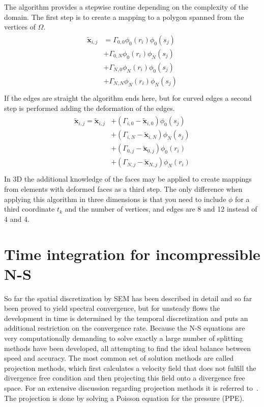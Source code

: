 The algorithm provides a stepwise routine depending on the complexity of the domain. The first step is to create 
a mapping to a polygon spanned from the vertices of $\Omega$.
%
\begin{align}
    \begin{split}
    \mathbf{\tilde{x}}_{i,j} 
             &=\Gamma_{0,0}\phi_0(r_i)\phi_0(s_j)\\
             &+\Gamma_{0,N}\phi_0(r_i)\phi_N(s_j)\\
             &+\Gamma_{N,0}\phi_N(r_i)\phi_0(s_j)\\
             &+\Gamma_{N,N}\phi_N(r_i)\phi_N(s_j)\\
    \end{split}
    \label{eq:gh1}
\end{align}
%
If the edges are straight the algorithm ends here, but for curved edges a second step is performed adding 
the deformation of the edges.
%
\begin{align}
    \begin{split}
        \mathbf{\tilde{x}}_{i,j}  = \mathbf{\tilde{x}}_{i,j} 
             &+(\Gamma_{i,0}-\mathbf{\tilde{x}}_{i,0})\phi_0(s_j)\\
             &+(\Gamma_{i,N}-\mathbf{\tilde{x}}_{i,N})\phi_N(s_j)\\
             &+(\Gamma_{0,j}-\mathbf{\tilde{x}}_{0,j})\phi_0(r_i)\\
             &+(\Gamma_{N,j}-\mathbf{\tilde{x}}_{N,j})\phi_N(r_i)\\
    \end{split}
    \label{eq:gh1}
\end{align}
%
In 3D the additional knowledge of the faces may be applied to create mappings from elements with deformed faces as a 
third step. The only difference when applying this algorithm in three dimensions is that you need to include $\phi$
for a third coordinate $t_k$ and the number of vertices, and edges are 8 and 12 instead of 
4 and 4.



\section{Time integration for incompressible N-S} \label{timeNS}

So far the spatial discretization by SEM has been described in detail and so far been proved to yield spectral convergence,
but for unsteady flows the development in time is determined by the temporal discretization and puts an additional 
restriction on the convergence rate. Because the N-S equations are very computationally demanding to solve exactly 
a large number of splitting methods have been developed, all attempting to find the ideal balance between speed 
and accuracy. The most common set of solution methods are called projection methods, which first calculates 
a velocity field that does not fulfill the divergence free condition and then projecting this field onto a 
divergence free space. For an extensive discussion regarding projection methods it is referred to~\cite{Guermond2006}.
The projection is done by solving a Poisson equation for the pressure (PPE). 

